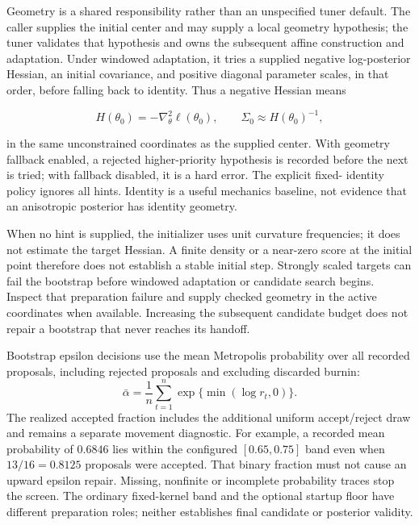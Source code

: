 Geometry is a shared responsibility rather than an unspecified tuner default.
The caller supplies the initial center and may supply a local geometry
hypothesis; the tuner validates that hypothesis and owns the subsequent affine
construction and adaptation.  Under windowed adaptation, it tries a supplied
negative log-posterior Hessian, an initial covariance, and positive diagonal
parameter scales, in that order, before falling back to identity.  Thus a
negative Hessian means

\begin{equation}
  H(\theta_0)=-\nabla_{\theta}^{2}\ell(\theta_0),
  \qquad
  \Sigma_0 \approx H(\theta_0)^{-1},
  \label{eq:bf-ordinary-hmc-initial-geometry}
\end{equation}

\noindent
in the same unconstrained coordinates as the supplied center.  With geometry
fallback enabled, a rejected higher-priority hypothesis is recorded before the
next is tried; with fallback disabled, it is a hard error.  The explicit fixed-
identity policy ignores all hints.  Identity is a useful mechanics baseline,
not evidence that an anisotropic posterior has identity geometry.

When no hint is supplied, the initializer uses unit curvature frequencies;
it does not estimate the target Hessian. A finite density or a near-zero score
at the initial point therefore does not establish a stable initial step.
Strongly scaled targets can fail the bootstrap before windowed adaptation or
candidate search begins. Inspect that preparation failure and supply checked
geometry in the active coordinates when available. Increasing the subsequent
candidate budget does not repair a bootstrap that never reaches its handoff.

Bootstrap epsilon decisions use the mean Metropolis probability over all
recorded proposals, including rejected proposals and excluding discarded burnin:
\[
  \bar\alpha=\frac{1}{n}\sum_{t=1}^{n}
     \exp\{\min(\log r_t,0)\}.
\]
The realized accepted fraction includes the additional uniform accept/reject
draw and remains a separate movement diagnostic. For example, a recorded mean
probability of $0.6846$ lies within the configured $[0.65,0.75]$ band even when
$13/16=0.8125$ proposals were accepted. That binary fraction must not cause an
upward epsilon repair. Missing, nonfinite or incomplete probability traces stop
the screen. The ordinary fixed-kernel band and the optional startup floor have
different preparation roles; neither establishes final candidate or posterior
validity.

